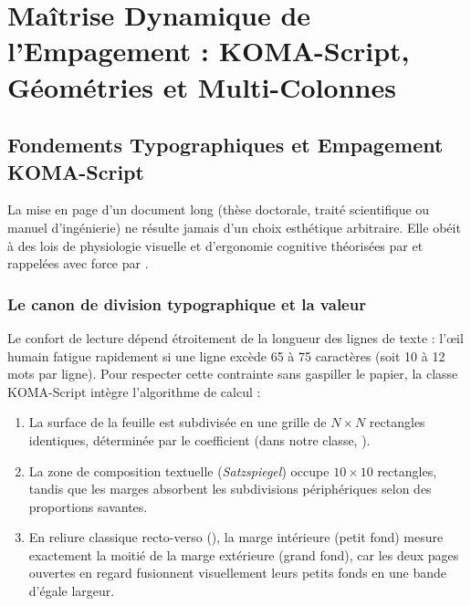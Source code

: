 \chapter{Maîtrise Dynamique de l'Empagement : KOMA-Script, Géométries et Multi-Colonnes}
\label{chap:dynamique-empagement}

\section{Fondements Typographiques et Empagement KOMA-Script}
\label{sec:fondements-typographiques}

La mise en page d'un document long (thèse doctorale, traité scientifique ou manuel d'ingénierie)
ne résulte jamais d'un choix esthétique arbitraire.
Elle obéit à des lois de physiologie visuelle et d'ergonomie cognitive théorisées par \textcite{tschichold1991form}
et rappelées avec force par \textcite{bringhurst2004elements}.

\subsection{Le canon de division typographique et la valeur }
Le confort de lecture dépend étroitement de la longueur des lignes de texte :
l'\oe{}il humain fatigue rapidement si une ligne excède 65 à 75 caractères (soit 10 à 12 mots par ligne).
Pour respecter cette contrainte sans gaspiller le papier,
la classe KOMA-Script  intègre l'algorithme de calcul  :

\begin{enumerate}
  \item La surface de la feuille est subdivisée en une grille de $N \times N$ rectangles identiques,
  déterminée par le coefficient  (dans notre classe, ).
  \item La zone de composition textuelle (\textit{Satzspiegel}) occupe $10 \times 10$ rectangles,
  tandis que les marges absorbent les subdivisions périphériques selon des proportions savantes.
  \item En reliure classique recto-verso (), la marge intérieure (petit fond)
  mesure exactement la moitié de la marge extérieure (grand fond),
  car les deux pages ouvertes en regard fusionnent visuellement leurs petits fonds en une bande d'égale largeur.
\end{enumerate}

